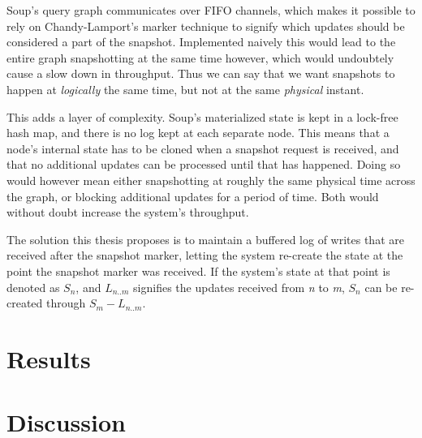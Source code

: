 \documentclass[b5paper]{report}
\begin{document}
Soup's query graph communicates over FIFO channels, which makes it possible to
rely on Chandy-Lamport's marker technique to signify which updates should be
considered a part of the snapshot. Implemented naively this would lead to the
entire graph snapshotting at the same time however, which would undoubtely cause
a slow down in throughput. Thus we can say that we want snapshots to happen at
\textit{logically} the same time, but not at the same \textit{physical} instant.

This adds a layer of complexity. Soup's materialized state is kept in a
lock-free hash map, and there is no log kept at each separate node. This means
that a node's internal state has to be cloned when a snapshot request is
received, and that no additional updates can be processed until that has
happened. Doing so would however mean either snapshotting at roughly the same
physical time across the graph, or blocking additional updates for a period of
time. Both would without doubt increase the system's throughput.

The solution this thesis proposes is to maintain a buffered log of writes that
are received after the snapshot marker, letting the system re-create the state
at the point the snapshot marker was received. If the system's state at that
point is denoted as $ S_n $, and $ L_{n..m} $ signifies the updates received
from \textit{n} to \textit{m}, $ S_n $ can be re-created through
$ S_m - L_{n..m} $.

\chapter{Results}
\chapter{Discussion}



\end{document}
